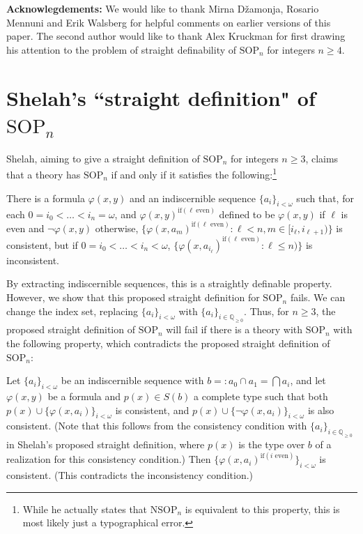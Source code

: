 \documentclass{article}
\theoremstyle{definition}
\theoremstyle{definition}
\theoremstyle{definition}
\begin{document}
\textbf{Acknowlegdements:} We would like to thank Mirna Džamonja, Rosario Mennuni and Erik Walsberg for helpful comments on earlier versions of this paper. The second author would like to thank Alex Kruckman for first drawing his attention to the problem of straight definability of $\mathrm{SOP}_n$ for integers $n \geq 4$. %


\appendix

\section{Shelah's ``straight definition" of $\mathrm{SOP}_{n}$}\label{shelah ``straight definition"}

 Shelah, aiming to give a straight definition of $\mathrm{SOP}_{n}$ for integers $n \geq 3$, claims that a theory has $\mathrm{SOP}_{n}$ if and only if it satisfies the following:\footnote{While he actually states that $\mathrm{NSOP}_{n}$ is equivalent to this property, this is most likely just a typographical error.}

    There is a formula $\varphi(x, y)$ and an indiscernible sequence $\{a_{i}\}_{i < \omega}$ such that, for each $0=i_{0} < \ldots < i_{n} = \omega$, and $\varphi(x, y)^{\mathrm{if}(\mathrm{\ell \: even})}$ defined to be $\varphi(x, y)$ if $\ell$ is even and $\neg\varphi(x, y)$ otherwise, $\{\varphi(x, a_m)^{\text{if}(\ell\text{ even})} : \ell < n, m \in [i_\ell,i_{\ell+1})\}$ is consistent, but if $0=i_{0} < \ldots < i_{n} < \omega$, $\{\varphi(x, a_{i_\ell})^{\text{if}(\ell\text{ even})} : \ell \leq n)\}$ is inconsistent.


    By extracting indiscernible sequences, this is a straightly definable property. However, we show that this proposed straight definition for $\mathrm{SOP}_{n}$ fails. We can change the index set, replacing $\{a_{i}\}_{i < \omega}$ with $\{a_{i}\}_{i \in \mathbb{Q}_{\geq 0}}$. Thus, for $n \geq 3$, the proposed straight definition of $\mathrm{SOP}_{n}$ will fail if there is a theory with $\mathrm{SOP}_{n}$ with the following property, which contradicts the proposed straight definition of $\mathrm{SOP}_{n}$:

    Let $\{a_{i}\}_{i < \omega}$ be an indiscernible sequence with $b =: a_{0} \cap a_{1} = \bigcap a_{i}$, and let $\varphi(x, y)$ be a formula and $p(x) \in S(b)$ a complete type such that both $p(x) \cup \{\varphi(x, a_{i})\}_{ i < \omega}$ is consistent, and $p(x) \cup \{\neg\varphi(x, a_{i})\}_{ i < \omega}$ is also consistent. (Note that this follows from the consistency condition with $\{a_{i}\}_{i \in \mathbb{Q}_{\geq 0}}$ in Shelah's proposed straight definition, where $p(x)$ is the type over $b$ of a realization for this consistency condition.) Then $\{\varphi(x, a_{i})^{\text{if}(i \text{ even})} \}_{ i < \omega}$ is consistent. (This contradicts the inconsistency condition.)
\end{document}
